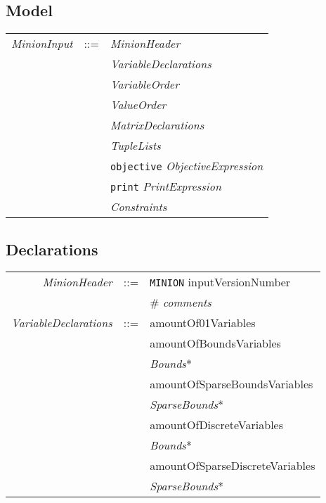 \documentclass{article}
\begin{document}
\begin{small}
\begin{center}
\begin{itemize}
\end{itemize}
\end{center}

\noindent

\subsection{Model}
\begin{tabular}{rcl}
\textit{MinionInput}& ::= & \textit{MinionHeader} \\
                    &     & \textit{VariableDeclarations} \\
                    &     & \textit{VariableOrder} \\
                    &     & \textit{ValueOrder} \\
                    &     & \textit{MatrixDeclarations} \\
                    &     & \textit{TupleLists} \\
                    &     & \texttt{objective} \textit{ObjectiveExpression} \\ 
		    &     & \texttt{print} \textit{PrintExpression} \\
                    &     & \textit{Constraints} \\


\end{tabular}


\subsection{Declarations}
\begin{tabular}{rcl}
\textit{MinionHeader} & ::= & \texttt{MINION} inputVersionNumber\\
                     &     &  \# \textit{comments}  \\

\textit{VariableDeclarations}& ::=  
                    &  amountOf01Variables  \\
               &     &  amountOfBoundsVariables \\
               &     &  \textit{Bounds}*  \\
               &     &  amountOfSparseBoundsVariables \\
               &     &  \textit{SparseBounds}* \\
               &     &  amountOfDiscreteVariables \\
               &     & \textit{Bounds}* \\
               &     & amountOfSparseDiscreteVariables \\
               &     & \textit{SparseBounds}* \\


\end{tabular}
\end{small}
\end{document}
